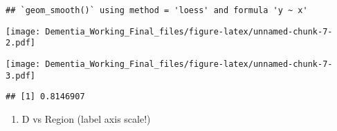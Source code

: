 \documentclass[]{article}
\newenvironment{Shaded}{\begin{snugshade}}{\end{snugshade}}
\newcommand{\DecValTok}[1]{\textcolor[rgb]{0.00,0.00,0.81}{#1}}
\newcommand{\KeywordTok}[1]{\textcolor[rgb]{0.13,0.29,0.53}{\textbf{#1}}}
\newcommand{\NormalTok}[1]{#1}
\newcommand{\OperatorTok}[1]{\textcolor[rgb]{0.81,0.36,0.00}{\textbf{#1}}}
\newcommand{\StringTok}[1]{\textcolor[rgb]{0.31,0.60,0.02}{#1}}
\providecommand{\tightlist}{%
  \setlength{\itemsep}{0pt}\setlength{\parskip}{0pt}}
\begin{document}
\begin{verbatim}
## `geom_smooth()` using method = 'loess' and formula 'y ~ x'
\end{verbatim}

\texttt{[image: Dementia\_Working\_Final\_files/figure-latex/unnamed-chunk-7-2.pdf]}

\begin{Shaded}
\end{Shaded}

\texttt{[image: Dementia\_Working\_Final\_files/figure-latex/unnamed-chunk-7-3.pdf]}

\begin{Shaded}
\end{Shaded}

\begin{verbatim}
## [1] 0.8146907
\end{verbatim}

\begin{enumerate}
\def\labelenumi{\alph{enumi}.}
\setcounter{enumi}{2}
\tightlist
\item
  D vs Region (label axis scale!)
\end{enumerate}
\end{document}
